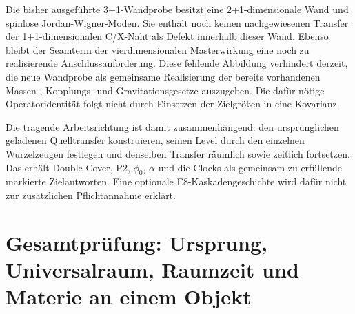 Die bisher ausgeführte 3+1-Wandprobe besitzt eine 2+1-dimensionale Wand und spinlose Jordan-Wigner-Moden. Sie enthält noch keinen nachgewiesenen Transfer der 1+1-dimensionalen C/X-Naht als Defekt innerhalb dieser Wand. Ebenso bleibt der Seamterm der vierdimensionalen Masterwirkung eine noch zu realisierende Anschlussanforderung. Diese fehlende Abbildung verhindert derzeit, die neue Wandprobe als gemeinsame Realisierung der bereits vorhandenen Massen-, Kopplungs- und Gravitationsgesetze auszugeben. Die dafür nötige Operatoridentität folgt nicht durch Einsetzen der Zielgrößen in eine Kovarianz.

Die tragende Arbeitsrichtung ist damit zusammenhängend: den ursprünglichen geladenen Quelltransfer konstruieren, seinen Level durch den einzelnen Wurzelzeugen festlegen und denselben Transfer räumlich sowie zeitlich fortsetzen. Das erhält Double Cover, P2, $\phi_0$, $\alpha$ und die Clocks als gemeinsam zu erfüllende markierte Zielantworten. Eine optionale E8-Kaskadengeschichte wird dafür nicht zur zusätzlichen Pflichtannahme erklärt.

\section{Gesamtprüfung: Ursprung, Universalraum, Raumzeit und Materie an einem Objekt}\label{sec:jointclosure}


